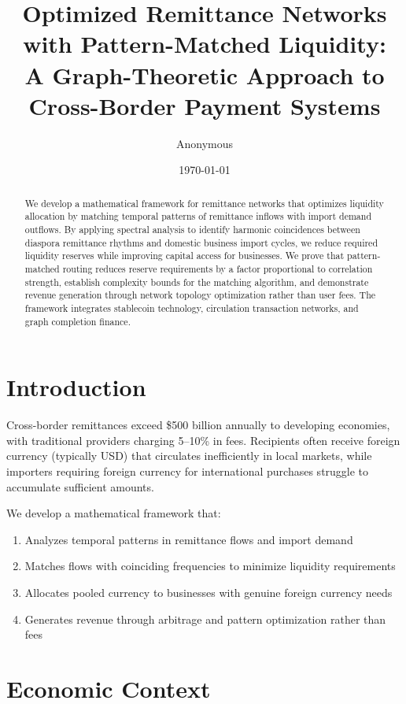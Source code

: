 \documentclass[12pt]{article}
\title{Optimized Remittance Networks with Pattern-Matched Liquidity:\\
A Graph-Theoretic Approach to Cross-Border Payment Systems}
\author{Anonymous}
\date{\today}
\begin{document}
\maketitle

\begin{abstract}
We develop a mathematical framework for remittance networks that optimizes liquidity allocation by matching temporal patterns of remittance inflows with import demand outflows. By applying spectral analysis to identify harmonic coincidences between diaspora remittance rhythms and domestic business import cycles, we reduce required liquidity reserves while improving capital access for businesses. We prove that pattern-matched routing reduces reserve requirements by a factor proportional to correlation strength, establish complexity bounds for the matching algorithm, and demonstrate revenue generation through network topology optimization rather than user fees. The framework integrates stablecoin technology, circulation transaction networks, and graph completion finance.
\end{abstract}

\section{Introduction}

Cross-border remittances exceed \$500 billion annually to developing economies, with traditional providers charging 5--10\% in fees. Recipients often receive foreign currency (typically USD) that circulates inefficiently in local markets, while importers requiring foreign currency for international purchases struggle to accumulate sufficient amounts.

We develop a mathematical framework that:
\begin{enumerate}
    \item Analyzes temporal patterns in remittance flows and import demand
    \item Matches flows with coinciding frequencies to minimize liquidity requirements
    \item Allocates pooled currency to businesses with genuine foreign currency needs
    \item Generates revenue through arbitrage and pattern optimization rather than fees
\end{enumerate}

\section{Economic Context}
\end{document}

